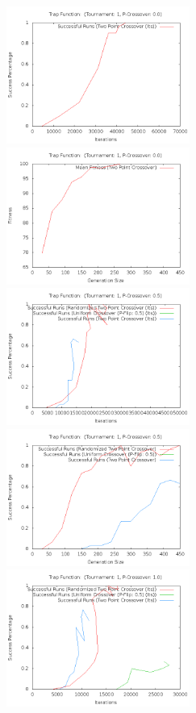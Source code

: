 \documentclass[10pt]{article}
\begin{document}
\begin{figure}[h!]
  \centering
    \includegraphics[height=170px]{img/TrapFunctionRandomIters.png}
    \includegraphics[height=170px]{img/TrapFunctionRandomGens.png}
    \includegraphics[height=170px]{img/TrapFunctionBothIters.png}
    \includegraphics[height=170px]{img/TrapFunctionBothGens.png}
    \includegraphics[height=170px]{img/TrapFunctionCrossoverIters.png}

\end{figure}
\end{document}
